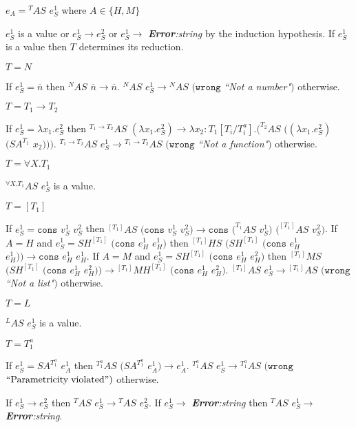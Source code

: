\begin{case}
\label{as}
$e_{A}={^{T}A}S$ $e_{S}^{1}$ where $A\in\lbrace H,M\rbrace$

$e_{S}^{1}$ is a value or $e_{S}^{1}\rightarrow e_{S}^{2}$ or $e_{S}^{1}\rightarrow$ \emph{\textbf{Error}:\;string} by the induction hypothesis.  If $e_{S}^{1}$ is a value then $T$ determines its reduction.
\begin{subcase}
$T=N$

If $e_{S}^{1}=\overline{n}$ then $^{N}AS$ $\overline{n}\rightarrow\overline{n}$.  $^{N}AS$ $e_{S}^{1}\rightarrow{^{N}A}S$ $(\mathtt{wrong}$ \emph{``Not a number"}$)$ otherwise.
\end{subcase}
\begin{subcase}
$T=T_{1}\rightarrow T_{2}$

If $e_{S}^{1}=\lambda x_{1}.e_{S}^{2}$ then $^{T_{1}\rightarrow T_{2}}AS$ $(\lambda x_{1}.e_{S}^{2})\rightarrow\lambda x_{2}:T_{1}[T_{i}/T^{a}_{i}].(^{T_{2}}AS$ $((\lambda x_{1}.e_{S}^{2})$ $(SA^{T_{1}}$ $x_{2})))$.  $^{T_{1}\rightarrow T_{2}}AS$ $e_{S}^{1}\rightarrow{^{T_{1}\rightarrow T_{2}}A}S$ $(\mathtt{wrong}$ \emph{``Not a function"}$)$ otherwise.
\end{subcase}
\begin{subcase}
$T=\forall X.T_{1}$

$^{\forall X.T_{1}}AS$ $e_{S}^{1}$ is a value.
\end{subcase}
\begin{subcase}
$T=[T_{1}]$

If $e_{S}^{1}=\mathtt{cons}$ $v_{S}^{1}$ $v_{S}^{2}$ then $^{[T_{1}]}AS$ $(\mathtt{cons}$ $v_{S}^{1}$ $v_{S}^{2})\rightarrow\mathtt{cons}$ $(^{T_{1}}AS$ $v_{S}^{1})$ $(^{[T_{1}]}AS$ $v_{S}^{2})$.  If $A=H$ and $e_{S}^{1}=SH^{[T_{1}]}$ $(\mathtt{cons}$ $e_{H}^{1}$ $e_{H}^{1})$ then $^{[T_{1}]}HS$ $(SH^{[T_{1}]}$ $(\mathtt{cons}$ $e_{H}^{1}$ $e_{H}^{1}))\rightarrow\mathtt{cons}$ $e_{H}^{1}$ $e_{H}^{1}$.  If $A=M$ and $e_{S}^{1}=SH^{[T_{1}]}$ $(\mathtt{cons}$ $e_{H}^{1}$ $e_{H}^{2})$ then $^{[T_{1}]}MS$ $(SH^{[T_{1}]}$ $(\mathtt{cons}$ $e_{H}^{1}$ $e_{H}^{2}))\rightarrow{^{[T_{1}]}M}H^{[T_{1}]}$ $(\mathtt{cons}$ $e_{H}^{1}$ $e_{H}^{2})$.  $^{[T_{1}]}AS$ $e_{S}^{1}\rightarrow{^{[T_{1}]}A}S$ $(\mathtt{wrong}$ \emph{``Not a list"}$)$ otherwise.
\end{subcase}
\begin{subcase}
$T=L$

$^{L}AS$ $e_{S}^{1}$ is a value.
\end{subcase}
\begin{subcase}
$T=T_{1}^{a}$

If $e_{S}^{1}=SA^{T_{1}^{a}}$ $e_{A}^{1}$ then $^{T_{1}^{a}}AS$ $(SA^{T_{1}^{a}}$ $e_{A}^{1})\rightarrow e_{A}^{1}$.  $^{T_{1}^{a}}AS$ $e_{S}^{1}\rightarrow{^{T_{1}^{a}}A}S$ $(\mathtt{wrong}$ $\mathrm{``Parametricity\;violated"})$ otherwise.
\end{subcase}
If $e_{S}^{1}\rightarrow e_{S}^{2}$ then $^{T}AS$ $e_{S}^{1}\rightarrow{^{T}A}S$ $e_{S}^{2}$.  If $e_{S}^{1}\rightarrow$ \emph{\textbf{Error}:\;string} then $^{T}AS$ $e_{S}^{1}\rightarrow$ \emph{\textbf{Error}:\;string}.
\end{case}
